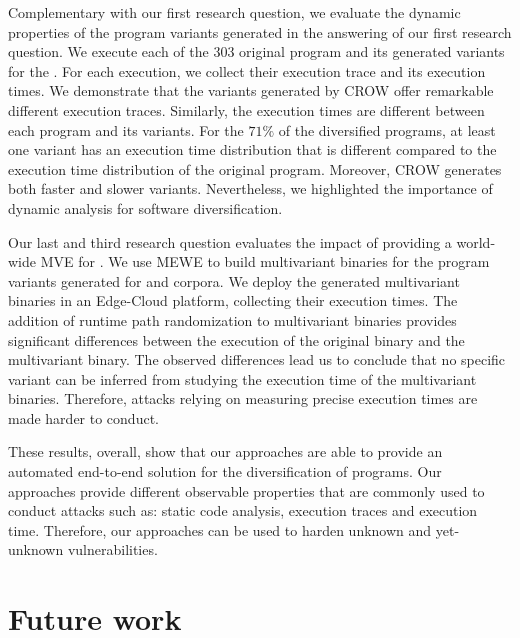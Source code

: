 Complementary with our first research question, we evaluate the dynamic properties of the program variants generated in the answering of our first research question.
We execute each of the 303 original program and its generated variants for the \corpusrosetta.
For each execution, we collect their execution trace and its execution times.
We demonstrate that the \wasm variants generated by CROW offer remarkable different execution traces.
Similarly, the execution times are different between each program and its variants.
For the $71\%$ of the diversified programs, at least one variant has an execution time distribution that is different compared to the execution time distribution of the original program.
Moreover, CROW generates both faster and slower variants.
Nevertheless, we highlighted the importance of dynamic analysis for software diversification. 

Our last and third research question evaluates the impact of providing a world-wide MVE for \wasm.
We use MEWE to build multivariant binaries for the program variants generated for \corpussodium and \corpusqrcode corpora.
We deploy the generated multivariant binaries in an Edge-Cloud platform, collecting their execution times.
The addition of runtime path randomization to multivariant binaries provides significant differences between the execution of the original binary and the multivariant binary.
The observed differences lead us to conclude that no specific variant can be inferred from studying the execution time of the multivariant binaries. Therefore, attacks relying on measuring precise execution times are made harder to conduct.


These results, overall, show that our approaches are able to provide an automated end-to-end solution for the diversification of \wasm programs. 
Our approaches provide different observable properties that are commonly used to conduct attacks such as: static code analysis, execution traces and execution time.
Therefore, our approaches can be used to harden unknown and yet-unknown vulnerabilities.

\section{Future work}
\label{future_work}




